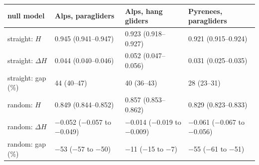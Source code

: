 \begin{tabular}{llll}
\toprule
null model & Alps, paragliders & Alps, hang gliders & Pyrenees, paragliders \\
\midrule
straight: $H$ & 0.945 (0.941--0.947) & 0.923 (0.918--0.927) & 0.921 (0.915--0.924) \\
straight: $\Delta H$ & 0.044 (0.040--0.046) & 0.052 (0.047--0.056) & 0.031 (0.025--0.035) \\
straight: gap (\%) & 44 (40--47) & 40 (36--43) & 28 (23--31) \\
random: $H$ & 0.849 (0.844--0.852) & 0.857 (0.853--0.862) & 0.829 (0.823--0.833) \\
random: $\Delta H$ & $-$0.052 ($-$0.057 to $-$0.049) & $-$0.014 ($-$0.019 to $-$0.009) & $-$0.061 ($-$0.067 to $-$0.056) \\
random: gap (\%) & $-$53 ($-$57 to $-$50) & $-$11 ($-$15 to $-$7) & $-$55 ($-$61 to $-$51) \\
\bottomrule
\end{tabular}
